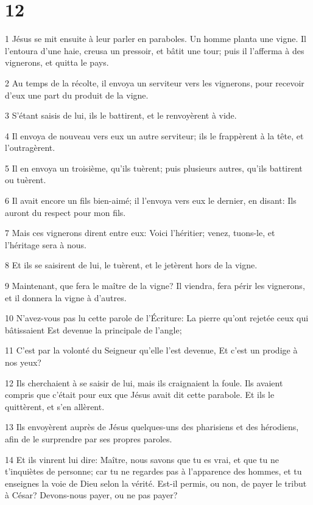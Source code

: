 \chapter{12}

\par 1 Jésus se mit ensuite à leur parler en paraboles. Un homme planta une vigne. Il l'entoura d'une haie, creusa un pressoir, et bâtit une tour; puis il l'afferma à des vignerons, et quitta le pays.
\par 2 Au temps de la récolte, il envoya un serviteur vers les vignerons, pour recevoir d'eux une part du produit de la vigne.
\par 3 S'étant saisis de lui, ils le battirent, et le renvoyèrent à vide.
\par 4 Il envoya de nouveau vers eux un autre serviteur; ils le frappèrent à la tête, et l'outragèrent.
\par 5 Il en envoya un troisième, qu'ils tuèrent; puis plusieurs autres, qu'ils battirent ou tuèrent.
\par 6 Il avait encore un fils bien-aimé; il l'envoya vers eux le dernier, en disant: Ils auront du respect pour mon fils.
\par 7 Mais ces vignerons dirent entre eux: Voici l'héritier; venez, tuons-le, et l'héritage sera à nous.
\par 8 Et ils se saisirent de lui, le tuèrent, et le jetèrent hors de la vigne.
\par 9 Maintenant, que fera le maître de la vigne? Il viendra, fera périr les vignerons, et il donnera la vigne à d'autres.
\par 10 N'avez-vous pas lu cette parole de l'Écriture: La pierre qu'ont rejetée ceux qui bâtissaient Est devenue la principale de l'angle;
\par 11 C'est par la volonté du Seigneur qu'elle l'est devenue, Et c'est un prodige à nos yeux?
\par 12 Ils cherchaient à se saisir de lui, mais ils craignaient la foule. Ils avaient compris que c'était pour eux que Jésus avait dit cette parabole. Et ils le quittèrent, et s'en allèrent.
\par 13 Ils envoyèrent auprès de Jésus quelques-uns des pharisiens et des hérodiens, afin de le surprendre par ses propres paroles.
\par 14 Et ils vinrent lui dire: Maître, nous savons que tu es vrai, et que tu ne t'inquiètes de personne; car tu ne regardes pas à l'apparence des hommes, et tu enseignes la voie de Dieu selon la vérité. Est-il permis, ou non, de payer le tribut à César? Devons-nous payer, ou ne pas payer?
